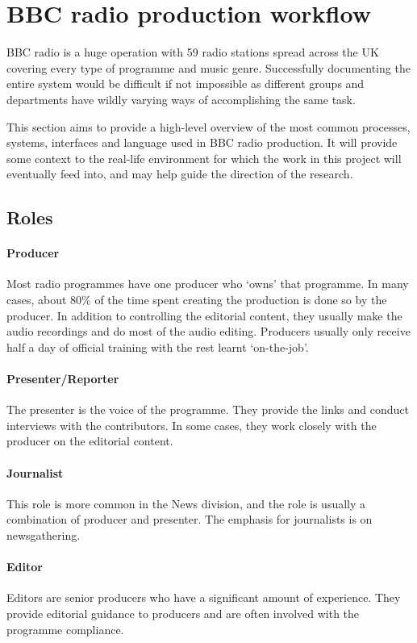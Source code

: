 \section{BBC radio production workflow}\label{sec:production}
BBC radio is a huge operation with 59 radio stations spread across the UK
covering every type of programme and music genre. Successfully documenting the
entire system would be difficult if not impossible as different groups and
departments have wildly varying ways of accomplishing the same task.

This section aims to provide a high-level overview of the most common
processes, systems, interfaces and language used in BBC radio production. It
will provide some context to the real-life environment for which the work in
this project will eventually feed into, and may help guide the direction of the
research.

\subsection{Roles}\label{sec:roles}

\paragraph{Producer}
Most radio programmes have one producer who `owns' that programme.  In many
cases, about 80\% of the time spent creating the production is done so by the
producer. In addition to controlling the editorial content, they usually make
the audio recordings and do most of the audio editing. Producers usually only
receive half a day of official training with the rest learnt `on-the-job'.

\paragraph{Presenter/Reporter}
The presenter is the voice of the programme. They provide the links and conduct
interviews with the contributors. In some cases, they work closely with the
producer on the editorial content.

\paragraph{Journalist}
This role is more common in the News division, and the role is usually a
combination of producer and presenter. The emphasis for journalists is on
newsgathering.

\paragraph{Editor}
Editors are senior producers who have a significant amount of experience. They
provide editorial guidance to producers and are often involved with the
programme compliance.

